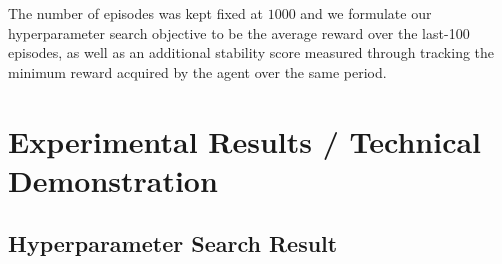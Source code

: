 \documentclass{article}
\begin{document}
The number of episodes was kept fixed at $1000$ and we formulate our hyperparameter search objective to be the average reward over the last-100 episodes, as well as an additional stability score measured through tracking the minimum reward acquired by the agent over the same period.

\section{Experimental Results / Technical Demonstration}
\subsection{Hyperparameter Search Result}
\end{document}
